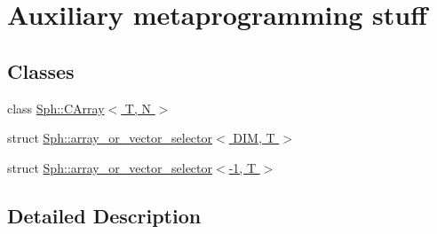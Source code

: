 \hypertarget{group__nanoflann__metaprog__grp}{}\section{Auxiliary metaprogramming stuff}
\label{group__nanoflann__metaprog__grp}
\subsection*{Classes}
\begin{DoxyCompactItemize}
\item 
class \hyperlink{classSph_1_1CArray}{Sph\+::\+C\+Array$<$ T, N $>$}
\item 
struct \hyperlink{structSph_1_1array__or__vector__selector}{Sph\+::array\+\_\+or\+\_\+vector\+\_\+selector$<$ D\+I\+M, T $>$}
\item 
struct \hyperlink{structSph_1_1array__or__vector__selector_3-1_00_01T_01_4}{Sph\+::array\+\_\+or\+\_\+vector\+\_\+selector$<$-\/1, T $>$}
\end{DoxyCompactItemize}


\subsection{Detailed Description}
